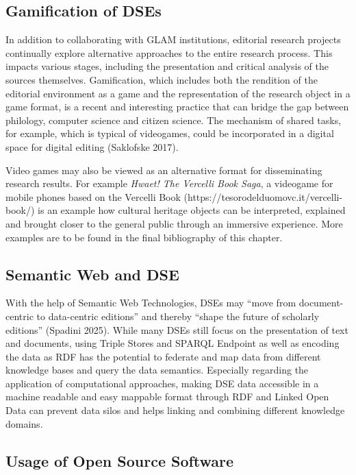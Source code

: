 \documentclass[
  letterpaper,
  DIV=11,
  numbers=noendperiod]{scrreprt}
\begin{document}
\subsection{Gamification of DSEs}\label{gamification-of-dses}

In addition to collaborating with GLAM institutions, editorial research
projects continually explore alternative approaches to the entire
research process. This impacts various stages, including the
presentation and critical analysis of the sources themselves.
Gamification, which includes both the rendition of the editorial
environment as a game and the representation of the research object in a
game format, is a recent and interesting practice that can bridge the
gap between philology, computer science and citizen science. The
mechanism of shared tasks, for example, which is typical of videogames,
could be incorporated in a digital space for digital editing (Saklofske
2017).

Video games may also be viewed as an alternative format for
disseminating research results. For example \emph{Hwaet! The Vercelli
Book Saga}, a videogame for mobile phones based on the Vercelli Book
(https://tesorodelduomovc.it/vercelli-book/) is an example how cultural
heritage objects can be interpreted, explained and brought closer to the
general public through an immersive experience. More examples are to be
found in the final bibliography of this chapter.

\subsection{Semantic Web and DSE}\label{semantic-web-and-dse}

With the help of Semantic Web Technologies, DSEs may ``move from
document-centric to data-centric editions'' and thereby ``shape the
future of scholarly editions'' (Spadini 2025). While many DSEs still
focus on the presentation of text and documents, using Triple Stores and
SPARQL Endpoint as well as encoding the data as RDF has the potential to
federate and map data from different knowledge bases and query the data
semantics. Especially regarding the application of computational
approaches, making DSE data accessible in a machine readable and easy
mappable format through RDF and Linked Open Data can prevent data silos
and helps linking and combining different knowledge domains.

\subsection{Usage of Open Source
Software}\label{usage-of-open-source-software}
\end{document}
